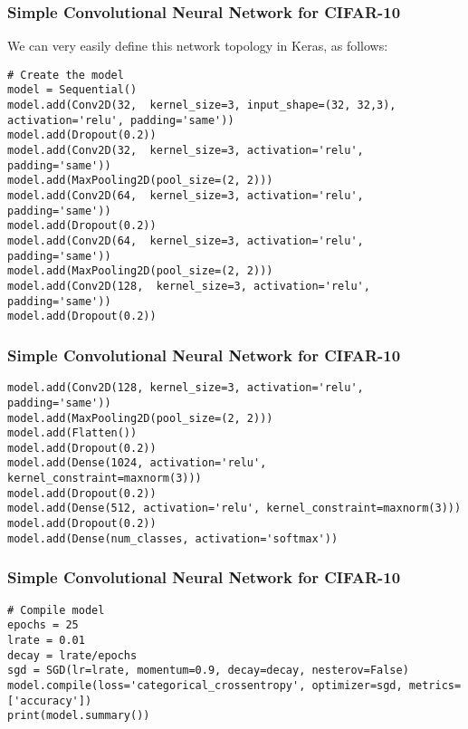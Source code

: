 \begin{frame}[fragile] \frametitle{Simple Convolutional Neural Network for CIFAR-10}
We can very easily define this network topology in Keras, as follows:
\begin{lstlisting}
# Create the model
model = Sequential()
model.add(Conv2D(32,  kernel_size=3, input_shape=(32, 32,3), activation='relu', padding='same'))
model.add(Dropout(0.2))
model.add(Conv2D(32,  kernel_size=3, activation='relu', padding='same'))
model.add(MaxPooling2D(pool_size=(2, 2)))
model.add(Conv2D(64,  kernel_size=3, activation='relu', padding='same'))
model.add(Dropout(0.2))
model.add(Conv2D(64,  kernel_size=3, activation='relu', padding='same'))
model.add(MaxPooling2D(pool_size=(2, 2)))
model.add(Conv2D(128,  kernel_size=3, activation='relu', padding='same'))
model.add(Dropout(0.2))
\end{lstlisting}

\end{frame}

\begin{frame}[fragile] \frametitle{Simple Convolutional Neural Network for CIFAR-10}
\begin{lstlisting}
model.add(Conv2D(128, kernel_size=3, activation='relu', padding='same'))
model.add(MaxPooling2D(pool_size=(2, 2)))
model.add(Flatten())
model.add(Dropout(0.2))
model.add(Dense(1024, activation='relu', kernel_constraint=maxnorm(3)))
model.add(Dropout(0.2))
model.add(Dense(512, activation='relu', kernel_constraint=maxnorm(3)))
model.add(Dropout(0.2))
model.add(Dense(num_classes, activation='softmax'))
\end{lstlisting}

\end{frame}

\begin{frame}[fragile] \frametitle{Simple Convolutional Neural Network for CIFAR-10}
\begin{lstlisting}
# Compile model
epochs = 25
lrate = 0.01
decay = lrate/epochs
sgd = SGD(lr=lrate, momentum=0.9, decay=decay, nesterov=False)
model.compile(loss='categorical_crossentropy', optimizer=sgd, metrics=['accuracy'])
print(model.summary())
\end{lstlisting}

\end{frame}

